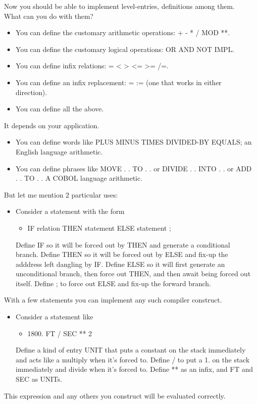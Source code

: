 \documentclass[b5paper, oneside]{book}
\begin{document}
Now you should be able to implement level-entries, definitions among them. What can you do with them?\begin{itemize}
   \item You can define the customary arithmetic operations: + - * / MOD **.
   \item You can define the customary logical operations: OR AND NOT IMPL.
   \item You can define infix relations: = < > <= >= /=.
   \item You can define an infix replacement: = := (one that works in either direction).
   \item You can define all the above.\end{itemize}
It depends on your application.\begin{itemize}
   \item You can define words like PLUS MINUS TIMES DIVIDED-BY EQUALS; an English language arithmetic.
   \item You can define phrases like MOVE . . TO . . or DIVIDE . . INTO . . or ADD . . TO . . A COBOL language arithmetic.\end{itemize}
But let me mention 2 particular uses:\begin{itemize}
   \item Consider a statement with the form\begin{itemize}
      \item IF relation THEN statement ELSE statement ;\end{itemize}
   Define IF so it will be forced out by THEN and generate a conditional branch. Define THEN so it will be forced out by ELSE and fix-up the adddress left dangling by IF. Define ELSE so it will first generate an unconditional branch, then force out THEN, and then await being forced out itself. Define ; to force out ELSE and fix-up the forward branch.\end{itemize}

With a few statements you can implement any such compiler construct.\begin{itemize}
   \item Consider a statement like\begin{itemize}
      \item 1800. FT / SEC ** 2\end{itemize}
   Define a kind of entry UNIT that puts a constant on the stack immediately and acts like a multiply when it's forced to. Define / to put a 1. on the stack immediately and divide when it's forced to. Define ** as an infix, and FT and SEC as UNITs.\end{itemize}
This expression and any others you construct will be evaluated correctly.
\end{document}
